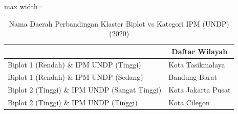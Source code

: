 \begin{table}[H]
\centering
\caption{Nama Daerah Perbandingan Klaster Biplot vs Kategori IPM (UNDP) (2020)} \label{tab:sample2crossname2020}
\begin{adjustbox}{max width=\textwidth}
\begin{tabular}{|>{\centering\arraybackslash}p{4cm}|p{10cm}|}
\hline
\multicolumn{1}{|c|}{\textbf{Kategori}} & \multicolumn{1}{c|}{\textbf{Daftar Wilayah}} \\
\hline
Biplot 1 (Rendah) \& IPM UNDP (Tinggi) & Kota Tasikmalaya \\
\hline
Biplot 1 (Rendah) \& IPM UNDP (Sedang) & Bandung Barat \\
\hline
Biplot 2 (Tinggi) \& IPM UNDP (Sangat Tinggi) & Kota Jakarta Pusat \\
\hline
Biplot 2 (Tinggi) \& IPM UNDP (Tinggi) & Kota Cilegon \\
\hline
\end{tabular}
\end{adjustbox}
\end{table}